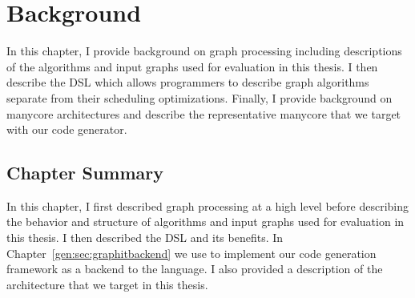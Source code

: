 \chapter{Background}\label{gen:sec:background}

In this chapter, I provide background on graph processing including descriptions of the algorithms and input graphs used for evaluation in this thesis.
I then describe the \graphit DSL which allows programmers to describe graph algorithms separate from their scheduling optimizations.
Finally, I provide background on manycore architectures and describe the representative manycore that we target with our code generator. 







\section{Chapter Summary}
In this chapter, I first described graph processing at a high level before describing the behavior and structure of algorithms and input graphs used for evaluation in this thesis.
I then described the \graphit DSL and its benefits.
In Chapter~\ref{gen:sec:graphitbackend} we use \graphit to implement our code generation framework as a backend to the language.
I also provided a description of the \hbmc architecture that we target in this thesis.